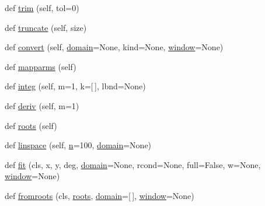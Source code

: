 \begin{DoxyCompactItemize}
\item 
def \hyperlink{classnumpy_1_1polynomial_1_1__polybase_1_1ABCPolyBase_ac62976cac19f9a881a678adcfd7f4a0c}{trim} (self, tol=0)
\item 
def \hyperlink{classnumpy_1_1polynomial_1_1__polybase_1_1ABCPolyBase_a6f6fb08396dbd3000483f8e4ce5868dc}{truncate} (self, size)
\item 
def \hyperlink{classnumpy_1_1polynomial_1_1__polybase_1_1ABCPolyBase_a8cc2deb5528f46aefdef6eae1bb0c0a6}{convert} (self, \hyperlink{classnumpy_1_1polynomial_1_1__polybase_1_1ABCPolyBase_aaf29f269a505cdb48cc84467414a497b}{domain}=None, kind=None, \hyperlink{classnumpy_1_1polynomial_1_1__polybase_1_1ABCPolyBase_a193a5e19ba940ca6b5a441151c0278e4}{window}=None)
\item 
def \hyperlink{classnumpy_1_1polynomial_1_1__polybase_1_1ABCPolyBase_abf63d55fa6cbba79e5c05e6bdf40449b}{mapparms} (self)
\item 
def \hyperlink{classnumpy_1_1polynomial_1_1__polybase_1_1ABCPolyBase_a34c8ec22e0970ead73ffe4117c8cf8b7}{integ} (self, m=1, k=\mbox{[}$\,$\mbox{]}, lbnd=None)
\item 
def \hyperlink{classnumpy_1_1polynomial_1_1__polybase_1_1ABCPolyBase_a85f245aded26dd056360baaed723ef49}{deriv} (self, m=1)
\item 
def \hyperlink{classnumpy_1_1polynomial_1_1__polybase_1_1ABCPolyBase_ab16160a3c047fca4324c3f4dd88da397}{roots} (self)
\item 
def \hyperlink{classnumpy_1_1polynomial_1_1__polybase_1_1ABCPolyBase_ae8f0a0279bacb546970c0ac661f1c513}{linspace} (self, \hyperlink{namespacenumpy_a352663c52853d2754274407d5cae2832}{n}=100, \hyperlink{classnumpy_1_1polynomial_1_1__polybase_1_1ABCPolyBase_aaf29f269a505cdb48cc84467414a497b}{domain}=None)
\item 
def \hyperlink{classnumpy_1_1polynomial_1_1__polybase_1_1ABCPolyBase_afb8f322ca5380c3ac0cfb00d7b9926a2}{fit} (cls, x, y, deg, \hyperlink{classnumpy_1_1polynomial_1_1__polybase_1_1ABCPolyBase_aaf29f269a505cdb48cc84467414a497b}{domain}=None, rcond=None, full=False, w=None, \hyperlink{classnumpy_1_1polynomial_1_1__polybase_1_1ABCPolyBase_a193a5e19ba940ca6b5a441151c0278e4}{window}=None)
\item 
def \hyperlink{classnumpy_1_1polynomial_1_1__polybase_1_1ABCPolyBase_a3935fad2dd06eb48276cf433d0bc5bed}{fromroots} (cls, \hyperlink{classnumpy_1_1polynomial_1_1__polybase_1_1ABCPolyBase_ab16160a3c047fca4324c3f4dd88da397}{roots}, \hyperlink{classnumpy_1_1polynomial_1_1__polybase_1_1ABCPolyBase_aaf29f269a505cdb48cc84467414a497b}{domain}=\mbox{[}$\,$\mbox{]}, \hyperlink{classnumpy_1_1polynomial_1_1__polybase_1_1ABCPolyBase_a193a5e19ba940ca6b5a441151c0278e4}{window}=None)

\end{DoxyCompactItemize}
